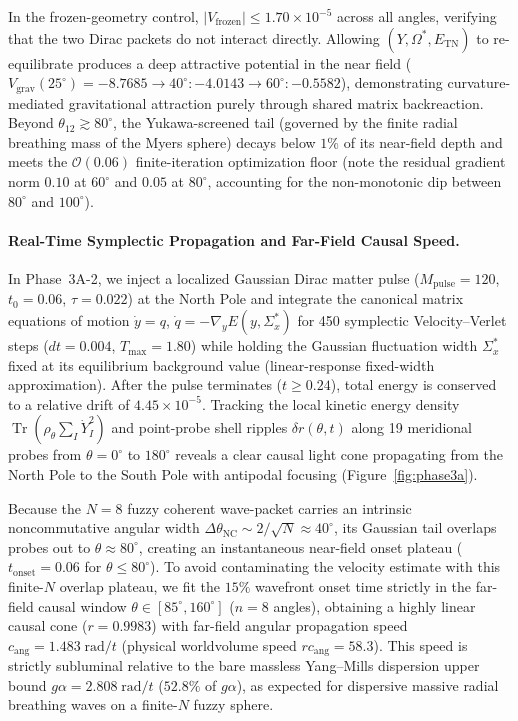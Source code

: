 \documentclass[11pt,a4paper]{article}
\DeclareMathOperator{\Tr}{Tr}
\begin{document}
In the frozen-geometry control, $|V_{\mathrm{frozen}}| \le 1.70\times 10^{-5}$ across all angles, verifying that the two Dirac packets do not interact directly. Allowing $(Y, \Omega^*, E_{\mathrm{TN}})$ to re-equilibrate produces a deep attractive potential in the near field ($V_{\mathrm{grav}}(25^\circ) = -8.7685 \to 40^\circ: -4.0143 \to 60^\circ: -0.5582$), demonstrating curvature-mediated gravitational attraction purely through shared matrix backreaction. Beyond $\theta_{12} \gtrsim 80^\circ$, the Yukawa-screened tail (governed by the finite radial breathing mass of the Myers sphere) decays below $1\%$ of its near-field depth and meets the $\mathcal{O}(0.06)$ finite-iteration optimization floor (note the residual gradient norm $0.10$ at $60^\circ$ and $0.05$ at $80^\circ$, accounting for the non-monotonic dip between $80^\circ$ and $100^\circ$).

\paragraph{Real-Time Symplectic Propagation and Far-Field Causal Speed.}
In Phase~3A-2, we inject a localized Gaussian Dirac matter pulse ($M_{\mathrm{pulse}} = 120$, $t_0 = 0.06$, $\tau = 0.022$) at the North Pole and integrate the canonical matrix equations of motion $\dot{y} = q$, $\dot{q} = -\nabla_y E(y, \Sigma_x^*)$ for 450 symplectic Velocity--Verlet steps ($dt = 0.004$, $T_{\max} = 1.80$) while holding the Gaussian fluctuation width $\Sigma_x^*$ fixed at its equilibrium background value (linear-response fixed-width approximation). After the pulse terminates ($t \ge 0.24$), total energy is conserved to a relative drift of $4.45\times 10^{-5}$. Tracking the local kinetic energy density $\Tr(\rho_\theta \sum_I \dot{Y}_I^2)$ and point-probe shell ripples $\delta r(\theta, t)$ along 19 meridional probes from $\theta = 0^\circ$ to $180^\circ$ reveals a clear causal light cone propagating from the North Pole to the South Pole with antipodal focusing (Figure~\ref{fig:phase3a}).

Because the $N=8$ fuzzy coherent wave-packet carries an intrinsic noncommutative angular width $\Delta\theta_{\mathrm{NC}} \sim 2/\sqrt{N} \approx 40^\circ$, its Gaussian tail overlaps probes out to $\theta \approx 80^\circ$, creating an instantaneous near-field onset plateau ($t_{\mathrm{onset}} = 0.06$ for $\theta \le 80^\circ$). To avoid contaminating the velocity estimate with this finite-$N$ overlap plateau, we fit the $15\%$ wavefront onset time strictly in the far-field causal window $\theta \in [85^\circ, 160^\circ]$ ($n=8$ angles), obtaining a highly linear causal cone ($r = 0.9983$) with far-field angular propagation speed $c_{\mathrm{ang}} = 1.483\;\mathrm{rad}/t$ (physical worldvolume speed $r c_{\mathrm{ang}} = 58.3$). This speed is strictly subluminal relative to the bare massless Yang--Mills dispersion upper bound $g\alpha = 2.808\;\mathrm{rad}/t$ ($52.8\%$ of $g\alpha$), as expected for dispersive massive radial breathing waves on a finite-$N$ fuzzy sphere.
\end{document}
